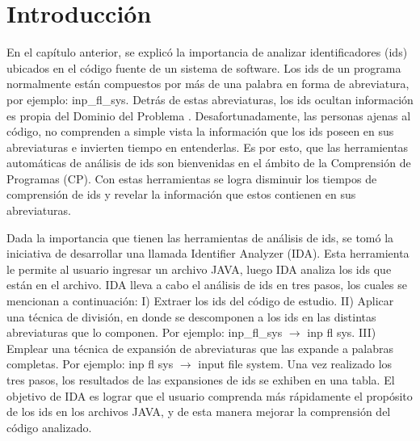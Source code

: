 \fancyhf{}
\pagestyle{fancy}
\lhead[]{\leftmark}
\chead[]{}
\rhead[]{\thepage}
\renewcommand{\headrulewidth}{1pt}

\section{Introducción}

En el capítulo anterior, se explicó la importancia de analizar identificadores (ids) ubicados en el código fuente de un sistema de software. Los ids de un programa normalmente están compuestos por más de una palabra en forma de abreviatura, por ejemplo: \textsf{inp\_fl\_sys}. Detrás de estas abreviaturas, los ids ocultan información es propia del Dominio del Problema \cite{BCPT99,LFBEX07,EZH08,EHPV09}. Desafortunadamente, las personas ajenas al código, no comprenden a simple vista la información que los ids poseen en sus abreviaturas e invierten tiempo en entenderlas. Es por esto, que las herramientas automáticas de análisis de ids son bienvenidas en el ámbito de la Comprensión de Programas (CP). Con estas herramientas se logra disminuir los tiempos de comprensión de ids y revelar la información que estos contienen en sus abreviaturas.

Dada la importancia que tienen las herramientas de análisis de ids, se tomó la iniciativa de desarrollar una llamada Identifier Analyzer (IDA). Esta herramienta le permite al usuario ingresar un archivo JAVA, luego IDA analiza los ids que están en el archivo.
IDA lleva a cabo el análisis de ids en tres pasos, los cuales se mencionan a continuación: I) Extraer los ids del código de estudio. II) Aplicar una técnica de división, en donde se descomponen a los ids en las distintas abreviaturas que lo componen. Por ejemplo: \textsf{inp\_fl\_sys} $\rightarrow$ \textsf{inp fl sys}. III) Emplear una técnica de expansión de abreviaturas que las expande a palabras completas. Por ejemplo: \textsf{inp fl sys} $\rightarrow$ \textsf{input file system}. Una vez realizado los tres pasos, los resultados de las expansiones de ids se exhiben en una tabla.
El objetivo de IDA es lograr que el usuario comprenda más rápidamente el propósito de los ids en los archivos JAVA, y de esta manera mejorar la comprensión del código analizado.


